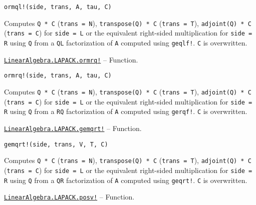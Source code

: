 \begin{adjustwidth}{2em}{0pt}


\begin{verbatim}
ormql!(side, trans, A, tau, C)
\end{verbatim}

Computes \texttt{Q * C} (\texttt{trans = N}), \texttt{transpose(Q) * C} (\texttt{trans = T}), \texttt{adjoint(Q) * C} (\texttt{trans = C}) for \texttt{side = L} or the equivalent right-sided multiplication for \texttt{side = R} using \texttt{Q} from a \texttt{QL} factorization of \texttt{A} computed using \texttt{geqlf!}. \texttt{C} is overwritten.



\end{adjustwidth}
\hypertarget{5502331798377291988}{}
\hyperlink{5502331798377291988}{\texttt{LinearAlgebra.LAPACK.ormrq!}}  -- {Function.}

\begin{adjustwidth}{2em}{0pt}


\begin{verbatim}
ormrq!(side, trans, A, tau, C)
\end{verbatim}

Computes \texttt{Q * C} (\texttt{trans = N}), \texttt{transpose(Q) * C} (\texttt{trans = T}), \texttt{adjoint(Q) * C} (\texttt{trans = C}) for \texttt{side = L} or the equivalent right-sided multiplication for \texttt{side = R} using \texttt{Q} from a \texttt{RQ} factorization of \texttt{A} computed using \texttt{gerqf!}. \texttt{C} is overwritten.



\end{adjustwidth}
\hypertarget{15151573161204836324}{}
\hyperlink{15151573161204836324}{\texttt{LinearAlgebra.LAPACK.gemqrt!}}  -- {Function.}

\begin{adjustwidth}{2em}{0pt}


\begin{verbatim}
gemqrt!(side, trans, V, T, C)
\end{verbatim}

Computes \texttt{Q * C} (\texttt{trans = N}), \texttt{transpose(Q) * C} (\texttt{trans = T}), \texttt{adjoint(Q) * C} (\texttt{trans = C}) for \texttt{side = L} or the equivalent right-sided multiplication for \texttt{side = R} using \texttt{Q} from a \texttt{QR} factorization of \texttt{A} computed using \texttt{geqrt!}. \texttt{C} is overwritten.



\end{adjustwidth}
\hypertarget{7595784839671568962}{}
\hyperlink{7595784839671568962}{\texttt{LinearAlgebra.LAPACK.posv!}}  -- {Function.}

